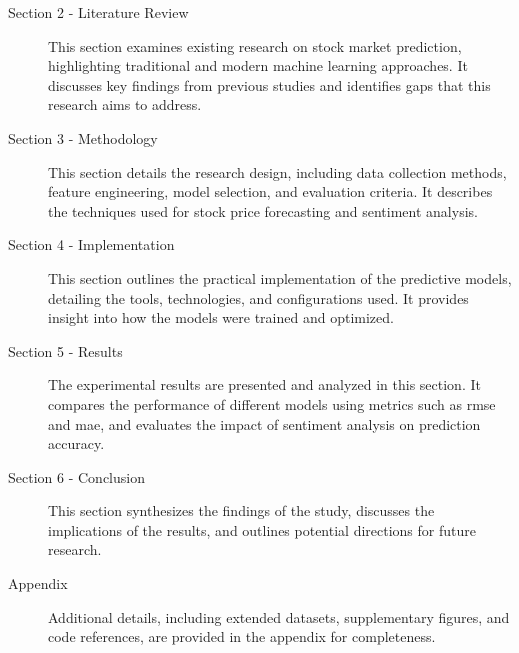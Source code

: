 \begin{description}
\item [Section 2 - Literature Review] This section examines existing research 
on stock market prediction, highlighting traditional and modern machine 
learning approaches. It discusses key findings from previous studies and 
identifies gaps that this research aims to address.
\item [Section 3 - Methodology] This section details the research design, 
including data collection methods, feature engineering, model selection, and 
evaluation criteria. It describes the techniques used for stock price
forecasting and sentiment analysis.
\item[Section 4 - Implementation] This section outlines the practical 
implementation of the predictive models, detailing the tools, 
technologies, and configurations used. It provides insight into how the
models were trained and optimized.
\item[Section 5 - Results] The experimental results are presented and analyzed 
in this section. It compares the performance of different models using metrics 
such as \acrshort{rmse} and \acrshort{mae}, and evaluates the impact of 
sentiment analysis on prediction accuracy.
\item[Section 6 - Conclusion] This section synthesizes the findings of the 
study, discusses the implications of the results, and outlines potential 
directions for future research.
\item[Appendix] Additional details, including extended datasets, supplementary 
figures, and code references, are provided in the appendix for completeness.
\end{description}



